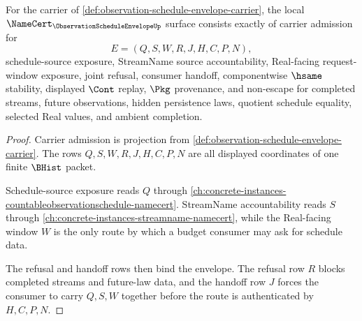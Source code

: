 \begin{theorem}
\label{thm:observation-schedule-envelope-namecert-obligations}
For the carrier of \autoref{def:observation-schedule-envelope-carrier}, the local $\NameCert_{\ObservationScheduleEnvelopeUp}$ surface consists exactly of carrier admission for
$$
E=(Q,S,W,R,J,H,C,P,N),
$$
schedule-source exposure, StreamName source accountability, Real-facing request-window exposure, joint refusal, consumer handoff, componentwise $\hsame$ stability, displayed $\Cont$ replay, $\Pkg$ provenance, and non-escape for completed streams, future observations, hidden persistence laws, quotient schedule equality, selected Real values, and ambient completion.
\end{theorem}
\begin{proof}
Carrier admission is projection from \autoref{def:observation-schedule-envelope-carrier}. The rows $Q,S,W,R,J,H,C,P,N$ are all displayed coordinates of one finite $\BHist$ packet.

Schedule-source exposure reads $Q$ through \autoref{ch:concrete-instances-countableobservationschedule-namecert}. StreamName accountability reads $S$ through \autoref{ch:concrete-instances-streamname-namecert}, while the Real-facing window $W$ is the only route by which a budget consumer may ask for schedule data.

The refusal and handoff rows then bind the envelope. The refusal row $R$ blocks completed streams and future-law data, and the handoff row $J$ forces the consumer to carry $Q,S,W$ together before the route is authenticated by $H,C,P,N$.
\end{proof}

